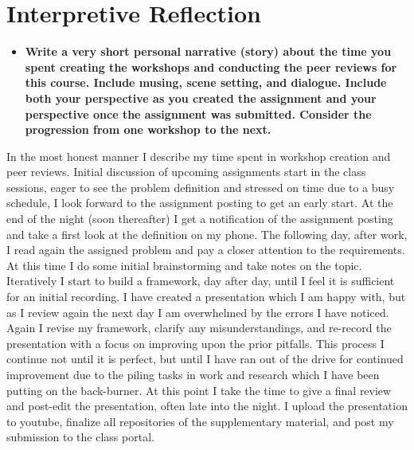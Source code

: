 \documentclass[12pt]{article}
\begin{document}
\section{Interpretive Reflection}
\begin{itemize}
    \item \textbf{Write a very short personal narrative (story) about the time you spent creating the workshops and conducting the peer reviews for this course. Include musing, scene setting, and dialogue. Include both your perspective as you created the assignment and your perspective once the assignment was submitted.  Consider the progression from one workshop to the next.}
\end{itemize}

In the most honest manner I describe my time spent in workshop creation and peer reviews. Initial discussion of upcoming assignments start in the class sessions, eager to see the problem definition and stressed on time due to a busy schedule, I look forward to the assignment posting to get an early start. At the end of the night (soon thereafter) I get a notification of the assignment posting and take a first look at the definition on my phone. The following day, after work, I read again the assigned problem and pay a closer attention to the requirements. At this time I do some initial brainstorming and take notes on the topic. Iteratively I start to build a framework, day after day, until I feel it is sufficient for an initial recording. I have created a presentation which I am happy with, but as I review again the next day I am overwhelmed by the errors I have noticed. Again I revise my framework, clarify any misunderstandings, and re-record the presentation with a focus on improving upon the prior pitfalls. This process I continue not until it is perfect, but until I have ran out of the drive for continued improvement due to the piling tasks in work and research which I have been putting on the back-burner. At this point I take the time to give a final review and post-edit the presentation, often late into the night. I upload the presentation to youtube, finalize all repositories of the supplementary material, and post my submission to the class portal. 
\end{document}
